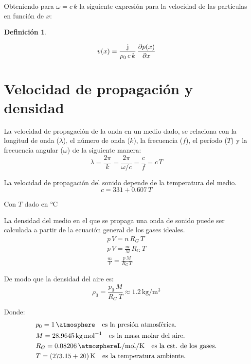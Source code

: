 \documentclass[a5paper,12pt,twoside]{book}
\newtheorem{defn}{{Definición}}[chapter]
\begin{document}
Obteniendo para $\omega=c\,k$ la siguiente expresión para la velocidad de las partículas en función de $x$:

\begin{mdframed}[style=DefinitionFrame]
    \begin{defn}
        \label{defn:particlesVelocity}
    \end{defn}
    \begin{equation*}
        v(x) = \frac{\mkern2mu\mathrm{j}\mkern1mu}{\rho_0 \, c \, k} \, \frac{\partial p(x)}{\partial x}
    \end{equation*}
\end{mdframed}

\section{Velocidad de propagación y densidad}

La velocidad de propagación de la onda en un medio dado, se relaciona con la longitud de onda ($\lambda$), el número de onda ($k$), la frecuencia ($f$), el período ($T$) y la frecuencia angular ($\omega$) de la siguiente manera:
\begin{equation*}
    \lambda = \frac{2 \pi}{k} = \frac{2 \pi}{\omega/c} = \frac{c}{f} = c \, T
\end{equation*}

La velocidad de propagación del sonido depende de la temperatura del medio.
\begin{equation*} %
    c = 331 + 0.607 \, T
\end{equation*}

Con $T$ dado en $\si{\celsius}$

La densidad del medio en el que se propaga una onda de sonido puede ser calculada a partir de la ecuación general de los gases ideales.
\begin{gather*}
    p \, V = n \, R_G \, T
    \\
    p \, V = \frac{m}{M} \, R_G \, T
    \\
    \frac{m}{V} = \frac{p \, M}{R_G \, T}
\end{gather*}

De modo que la densidad del aire es:
\begin{equation*}
    \rho_0 = \frac{p_0 \, M}{R_G \, T} \approx 1.2\,\si{\kilo\gram\per\metre^3}
\end{equation*}

Donde:
\begin{align*}
    & p_0 = 1\,\si{\atmosphere} \quad\text{es la presión atmosférica.}
    \\
    & M = 28.9645\,\si{\kilo\gram\per\mol} \quad\text{es la masa molar del aire.}
    \\
    & R_G = 0.08206\,\si{\atmosphere\litre\per\mol\per\kelvin} \quad\text{es la cst. de los gases.}
    \\
    & T = (273.15+20)\,\si{\kelvin} \quad\text{es la temperatura ambiente.}
\end{align*}
\end{document}
